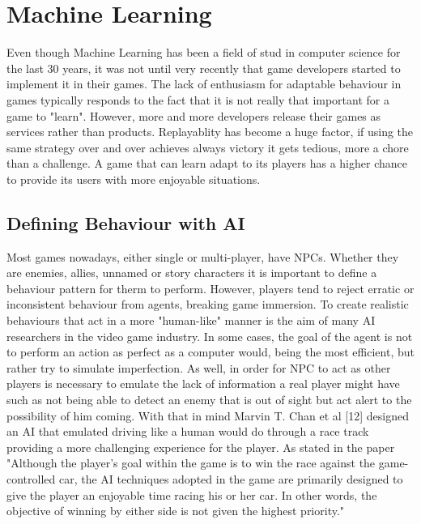 \section{Machine Learning}
Even though Machine Learning has been a field of stud in computer science for the last 30 years, it was not until very recently that game developers started to implement it in their games. The lack of enthusiasm for adaptable behaviour in games typically responds to the fact that it is not really that important for a game to "learn". However, more and more developers release their games as services rather than products. Replayablity has become a huge factor, if using the same strategy over and over achieves always victory it gets tedious, more a chore than a challenge. A game that can learn adapt to its players has a higher chance to provide its users with more enjoyable situations.

\subsection{Defining Behaviour with AI}
Most games nowadays, either single or multi-player, have NPCs. Whether they are enemies, allies, unnamed or story characters it is important to define a behaviour pattern for therm to perform. However, players tend to reject erratic or inconsistent behaviour from agents, breaking game immersion. To create realistic behaviours that act in a more "human-like" manner is the aim of many AI researchers in the video game industry. In some cases, the goal of the agent is not to perform an action as perfect as a computer would, being the most efficient, but rather try to simulate imperfection. As well, in order for NPC to act as other players is necessary to emulate the lack of information a real player might have such as not being able to detect an enemy that is out of sight but act alert to the possibility of him coming. With that in mind Marvin T. Chan et al [12] designed an AI that emulated driving like a human would do through a race track providing a more challenging experience for the player. As stated in the paper "Although the player’s goal within the game is to win the race against the game-controlled car, the AI techniques adopted in the game are primarily designed to give the player an enjoyable time racing his or her car. In other words, the objective of winning by either side is not given the highest priority."
 


